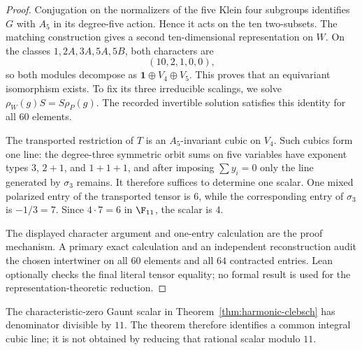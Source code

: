 \begin{proof}
Conjugation on the normalizers of the five Klein four subgroups identifies
\(G\) with \(A_5\) in its degree-five action.  Hence it acts on the ten
two-subsets.  The matching construction gives a second ten-dimensional
representation on \(W\).  On the classes
\(1,2A,3A,5A,5B\), both characters are
\[
 (10,2,1,0,0),
\]
so both modules decompose as \(\mathbf1\oplus V_4\oplus V_5\).
This proves that an equivariant isomorphism exists.  To fix its three
irreducible scalings, we solve
\(\rho_W(g)S=S\rho_P(g)\).  The recorded invertible solution satisfies
this identity for all \(60\) elements.

The transported restriction of \(T\) is an \(A_5\)-invariant cubic on
\(V_4\).  Such cubics form one line: the degree-three symmetric orbit sums
on five variables have exponent types \(3\), \(2+1\), and \(1+1+1\), and
after imposing \(\sum y_i=0\) only the line generated by
\(\sigma_3\) remains.  It therefore suffices to determine one scalar.
One mixed polarized entry of the transported tensor is \(6\), while the
corresponding entry of \(\sigma_3\) is \(-1/3=7\).  Since
\(4\cdot7=6\) in \(\F_{11}\), the scalar is \(4\).

The displayed character argument and one-entry calculation are the proof
mechanism.  A primary exact calculation and an independent reconstruction
audit the chosen intertwiner on all \(60\) elements and all \(64\)
contracted entries.  Lean optionally checks the final literal tensor
equality; no formal result is used for the representation-theoretic
reduction.
\end{proof}

\begin{remark}[Normalization]
The characteristic-zero Gaunt scalar in
Theorem~\ref{thm:harmonic-clebsch} has denominator
divisible by \(11\).  The theorem therefore identifies a common integral
cubic line; it is not obtained by reducing that rational scalar modulo
\(11\).
\end{remark}
